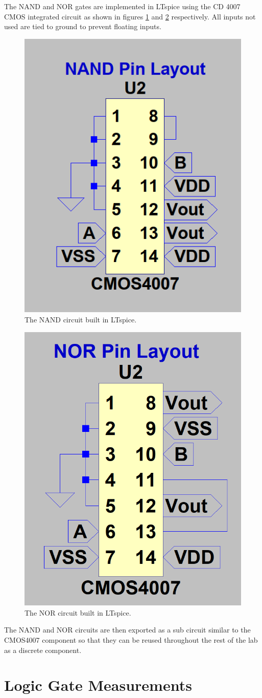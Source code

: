 \documentclass[titlepage, 12pt]{article}
\begin{document}
    The NAND and NOR gates are implemented in LTspice using the CD 4007
    CMOS integrated circuit as shown in figures \ref{fig:NAND_lt} and
    \ref{fig:NOR_lt} respectively. All inputs not used are tied to
    ground to prevent floating inputs.
    \begin{multicols}{2}
        \begin{figure}[H]
            \centering
            \includegraphics[width=0.4\linewidth]{figures/NAND_circuit.png}
            \caption{The NAND circuit built in LTspice.}
            \label{fig:NAND_lt}
        \end{figure}
        \begin{figure}[H]
            \centering
            \includegraphics[width=0.4\linewidth]{figures/NOR_circuit.png}
            \caption{The NOR circuit built in LTspice.}
            \label{fig:NOR_lt}
        \end{figure}
    \end{multicols}
    The NAND and NOR circuits are then exported as a sub circuit similar
    to the CMOS4007 component so that they can be reused throughout the
    rest of the lab as a discrete component.

    \section{Logic Gate Measurements}
\end{document}
